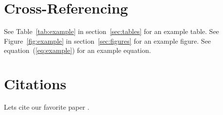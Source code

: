 \documentclass[a4paper, 12pt]{article}
\begin{document}

\section{Cross-Referencing}
See Table~\ref{tab:example} in section~\ref{sec:tables} for an example table.
See Figure~\ref{fig:example} in section~\ref{sec:figures} for an example figure.
See equation~(\ref{eq:example}) for an example equation.

\section{Citations}
Lets cite our favorite paper \cite{ramey2016macroeconomic}. \\
\cite{ramey2016macroeconomic} \\
\textcite{ramey2016macroeconomic} \\
\parencite{ramey2016macroeconomic}  \\
\parencite[p. 23]{ramey2016macroeconomic}  \\
\parencite[e.g.][]{ramey2016macroeconomic}  \\
\citeauthor{ramey2016macroeconomic} \\
\citeyear{ramey2016macroeconomic} \\

\appendix
\printbibliography
\end{document}

